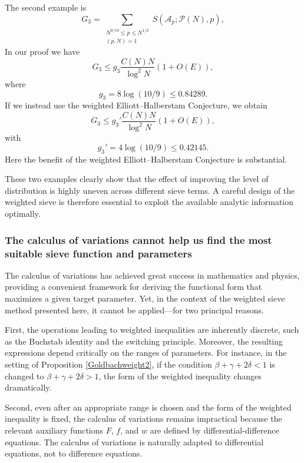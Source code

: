 \documentclass[12pt, a4paper]{amsart}
\def\le{\leqslant}
\theoremstyle{plain}
\theoremstyle{remark}
\numberwithin{equation}{section}
\begin{document}
The second example is  
\begin{equation}
G_3 =\sum\limits_{\substack{N^{9/19}\le p\le N^{1/2} \\(p, N)=1}}S(\mathscr{A}_p ; \mathscr{P}(N), p),
\end{equation} 
In our proof we have  
\begin{equation}
G_3 \le g_3\dfrac{C(N)N}{\log^2 N}(1+O(E)),
\end{equation}
where  
\begin{equation}
g_{3}=8\log(10/9)\le 0.84289. 
\end{equation}
If we instead use the weighted Elliott--Halberstam Conjecture, we obtain  
\begin{equation}
G_3 \le g_3'\dfrac{C(N)N}{\log^2 N}(1+O(E)),
\end{equation}
with  
\begin{equation}
g_{3}'=4\log(10/9)\le 0.42145. 
\end{equation}
Here the benefit of the weighted Elliott--Halberstam Conjecture is substantial.

These two examples clearly show that the effect of improving the level of distribution is highly uneven across different sieve terms. 
A careful design of the weighted sieve is therefore essential to exploit the available analytic information optimally. 

\subsubsection{The calculus of variations cannot help us find the most suitable sieve function and parameters}   
The calculus of variations has achieved great success in mathematics and physics, providing a convenient framework for deriving the functional form that maximizes a given target parameter. 
Yet, in the context of the weighted sieve method presented here, it cannot be applied—for two principal reasons.

First, the operations leading to weighted inequalities are inherently discrete, such as the Buchstab identity and the switching principle. 
Moreover, the resulting expressions depend critically on the ranges of parameters. 
For instance, in the setting of Proposition \ref{Goldbachweight2}, if the condition \(\beta + \gamma + 2\delta < 1\) is changed to \(\beta + \gamma + 2\delta > 1\), the form of the weighted inequality changes dramatically.

Second, even after an appropriate range is chosen and the form of the weighted inequality is fixed, the calculus of variations remains impractical because the relevant auxiliary functions \(F\), \(f\), and \(w\) are defined by differential-difference equations. 
The calculus of variations is naturally adapted to differential equations, not to difference equations. 
\end{document}
